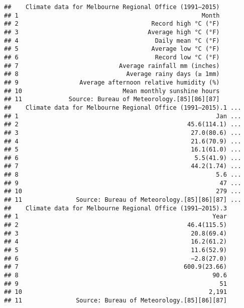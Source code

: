 \documentclass[nojss]{jss}\usepackage[]{graphicx}\usepackage[]{xcolor}
\makeatletter
\newenvironment{kframe}{%
 \def\at@end@of@kframe{}%
 \ifinner\ifhmode%
  \def\at@end@of@kframe{\end{minipage}}%
  \begin{minipage}{\columnwidth}%
 \fi\fi%
 \def\FrameCommand##1{\hskip\@totalleftmargin \hskip-\fboxsep
 \colorbox{shadecolor}{##1}\hskip-\fboxsep
     \hskip-\linewidth \hskip-\@totalleftmargin \hskip\columnwidth}%
 \MakeFramed {\advance\hsize-\width
   \@totalleftmargin\z@ \linewidth\hsize
   \@setminipage}}%
 {\par\unskip\endMakeFramed%
 \at@end@of@kframe}
\newenvironment{knitrout}{}{} %
\makeatother
\begin{document}
\begin{knitrout}
\color{fgcolor}\begin{kframe}
\begin{verbatim}
##    Climate data for Melbourne Regional Office (1991–2015)
## 1                                                   Month
## 2                                     Record high °C (°F)
## 3                                    Average high °C (°F)
## 4                                      Daily mean °C (°F)
## 5                                     Average low °C (°F)
## 6                                      Record low °C (°F)
## 7                            Average rainfall mm (inches)
## 8                              Average rainy days (≥ 1mm)
## 9                 Average afternoon relative humidity (%)
## 10                            Mean monthly sunshine hours
## 11             Source: Bureau of Meteorology.[85][86][87]
##    Climate data for Melbourne Regional Office (1991–2015).1 ...
## 1                                                       Jan ...
## 2                                               45.6(114.1) ...
## 3                                                27.0(80.6) ...
## 4                                                21.6(70.9) ...
## 5                                                16.1(61.0) ...
## 6                                                 5.5(41.9) ...
## 7                                                44.2(1.74) ...
## 8                                                       5.6 ...
## 9                                                        47 ...
## 10                                                      279 ...
## 11               Source: Bureau of Meteorology.[85][86][87] ...
##    Climate data for Melbourne Regional Office (1991–2015).3
## 1                                                      Year
## 2                                               46.4(115.5)
## 3                                                20.8(69.4)
## 4                                                16.2(61.2)
## 5                                                11.6(52.9)
## 6                                                −2.8(27.0)
## 7                                              600.9(23.66)
## 8                                                      90.6
## 9                                                        51
## 10                                                    2,191
## 11               Source: Bureau of Meteorology.[85][86][87]
\end{verbatim}
\end{kframe}
\end{knitrout}
\end{document}
